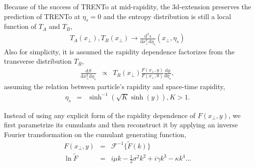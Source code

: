 \documentclass[aps,prl,twocolumn,groupedaddress]{revtex4-1}
\begin{document}
	Because of the success of TRENTo at mid-rapidity, the 3d-extension preserves the prediction of TRENTo at $\eta_s = 0$ and the entropy distribution is still a local function of $T_A$ and $T_B$,
	\begin{eqnarray}
	T_A(x_\perp), T_B(x_\perp) \rightarrow \frac{\mathrm{d^3}s}{\mathrm{d}x_{\perp}^2 \mathrm{d}\eta_s}\left(x_\perp, \eta_s\right)
	\end{eqnarray}
	Also for simplicity, it is assumed the rapidity dependence factorizes from the transverse distribution $T_R$,
	\begin{eqnarray}
		\frac{\mathrm{d}S}{\mathrm{d}x_{\perp}^2 \mathrm{d}\eta_s}  &\propto& T_R(x_\perp) \frac{F(x_\perp,y)}{F(x_\perp,0)}\frac{\mathrm{d}y}{\mathrm{d}\eta_s},
	\end{eqnarray}
assuming the relation between particle's rapidity and space-time rapidity,
	\begin{eqnarray}
		\eta_s &=& \sinh^{-1}(\sqrt{K}\sinh(y)), K>1. 
	\end{eqnarray}
	
	Instead of using any explicit form of the rapidity dependence of $F(x_\perp, y)$, we first parametrize its cumulants and then reconstruct it by applying an inverse Fourier transformation on the cumulant generating function,
	\begin{eqnarray}
	 	F(x_\perp,y) &=& \mathcal{F}^{-1}\{\tilde{F}(k)\} \\
	 	\ln \tilde{F} &=&  i \mu k - \frac{1}{2}\sigma^2 k^2 + i 	\gamma k^3  - \kappa k^4 ...
	\end{eqnarray}
\end{document}
